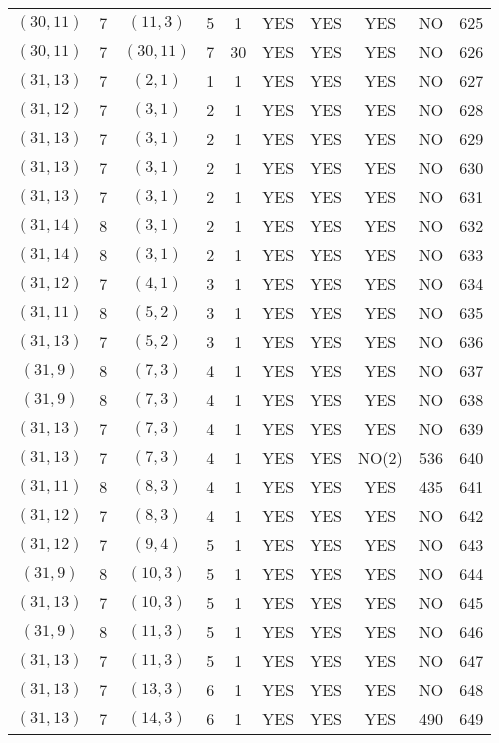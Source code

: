 \begin{longtable}{|c|c|c|c|c|c|c|c|c|c|}
$(30, 11)$ & 7 & $(11, 3)$ & 5 & 1 & YES & YES & YES & NO & 625\\
$(30, 11)$ & 7 & $(30, 11)$ & 7 & 30 & YES & YES & YES & NO & 626\\
$(31, 13)$ & 7 & $(2, 1)$ & 1 & 1 & YES & YES & YES & NO & 627\\
$(31, 12)$ & 7 & $(3, 1)$ & 2 & 1 & YES & YES & YES & NO & 628\\
$(31, 13)$ & 7 & $(3, 1)$ & 2 & 1 & YES & YES & YES & NO & 629\\
$(31, 13)$ & 7 & $(3, 1)$ & 2 & 1 & YES & YES & YES & NO & 630\\
$(31, 13)$ & 7 & $(3, 1)$ & 2 & 1 & YES & YES & YES & NO & 631\\
$(31, 14)$ & 8 & $(3, 1)$ & 2 & 1 & YES & YES & YES & NO & 632\\
$(31, 14)$ & 8 & $(3, 1)$ & 2 & 1 & YES & YES & YES & NO & 633\\
$(31, 12)$ & 7 & $(4, 1)$ & 3 & 1 & YES & YES & YES & NO & 634\\
$(31, 11)$ & 8 & $(5, 2)$ & 3 & 1 & YES & YES & YES & NO & 635\\
$(31, 13)$ & 7 & $(5, 2)$ & 3 & 1 & YES & YES & YES & NO & 636\\
$(31, 9)$ & 8 & $(7, 3)$ & 4 & 1 & YES & YES & YES & NO & 637\\
$(31, 9)$ & 8 & $(7, 3)$ & 4 & 1 & YES & YES & YES & NO & 638\\
$(31, 13)$ & 7 & $(7, 3)$ & 4 & 1 & YES & YES & YES & NO & 639\\
$(31, 13)$ & 7 & $(7, 3)$ & 4 & 1 & YES & YES & NO(2) & 536 & 640\\
$(31, 11)$ & 8 & $(8, 3)$ & 4 & 1 & YES & YES & YES & 435 & 641\\
$(31, 12)$ & 7 & $(8, 3)$ & 4 & 1 & YES & YES & YES & NO & 642\\
$(31, 12)$ & 7 & $(9, 4)$ & 5 & 1 & YES & YES & YES & NO & 643\\
$(31, 9)$ & 8 & $(10, 3)$ & 5 & 1 & YES & YES & YES & NO & 644\\
$(31, 13)$ & 7 & $(10, 3)$ & 5 & 1 & YES & YES & YES & NO & 645\\
$(31, 9)$ & 8 & $(11, 3)$ & 5 & 1 & YES & YES & YES & NO & 646\\
$(31, 13)$ & 7 & $(11, 3)$ & 5 & 1 & YES & YES & YES & NO & 647\\
$(31, 13)$ & 7 & $(13, 3)$ & 6 & 1 & YES & YES & YES & NO & 648\\
$(31, 13)$ & 7 & $(14, 3)$ & 6 & 1 & YES & YES & YES & 490 & 649\\

\end{longtable}
